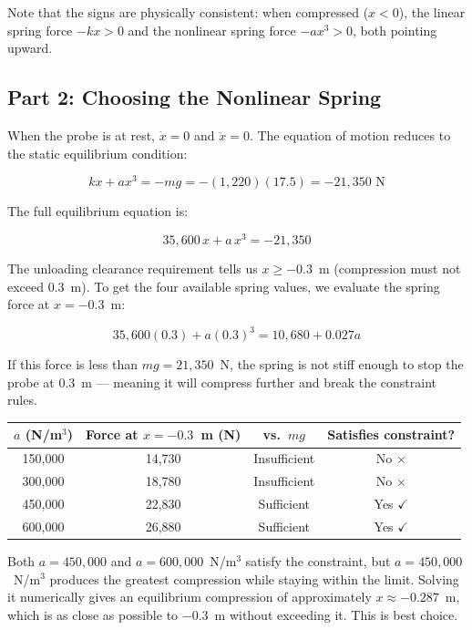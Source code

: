 \documentclass[12pt]{article}
\begin{document}
Note that the signs are physically consistent: when compressed ($x < 0$), the linear spring
force $-kx > 0$ and the nonlinear spring force $-ax^3 > 0$, both pointing upward.

\subsection{Part 2: Choosing the Nonlinear Spring}

When the probe is at rest, $\dot{x} = 0$ and $\ddot{x} = 0$. The equation of motion reduces
to the static equilibrium condition:

\[
    kx + ax^3 = -mg = -(1{,}220)(17.5) = -21{,}350 \text{ N}
\]

The full equilibrium equation is:

\[
    35{,}600\,x + a\,x^3 = -21{,}350
\]

The unloading clearance requirement tells us $x \geq -0.3$~m (compression must not exceed
0.3~m). To get the four available spring values, we evaluate the spring force at $x = -0.3$~m:

\[
    35{,}600(0.3) + a(0.3)^3 = 10{,}680 + 0.027a
\]

If this force is less than $mg = 21{,}350$~N, the spring is not stiff enough to stop the probe
at 0.3~m --- meaning it will compress further and break the constraint rules.

\begin{center}
\begin{tabular}{cccc}
\toprule
$a$ (N/m$^3$) & Force at $x = -0.3$~m (N) & vs.\ $mg$ & Satisfies constraint? \\
\midrule
150,000 & 14,730 & Insufficient & No $\times$ \\
300,000 & 18,780 & Insufficient & No $\times$ \\
450,000 & 22,830 & Sufficient & Yes $\checkmark$ \\
600,000 & 26,880 & Sufficient & Yes $\checkmark$ \\
\bottomrule
\end{tabular}
\end{center}

Both $a = 450{,}000$ and $a = 600{,}000$~N/m$^3$ satisfy the constraint, but $a = 450{,}000$~N/m$^3$
produces the greatest compression while staying within the limit. Solving it numerically
gives an equilibrium compression of approximately $x \approx -0.287$~m, which is as close as
possible to $-0.3$~m without exceeding it. This is best choice.
\end{document}
